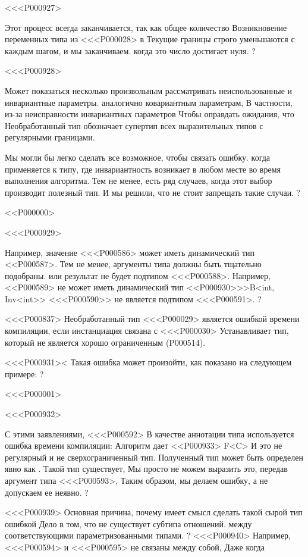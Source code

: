 <<<P000927>{%
Этот процесс всегда заканчивается, так как общее количество
Возникновение переменных типа из <<<P000028> в
Текущие границы строго уменьшаются с каждым шагом, и мы заканчиваем.
когда это число достигает нуля.%
?

<<<P000928>{%
Может показаться несколько произвольным рассматривать неиспользованные и инвариантные параметры.
аналогично ковариантным параметрам,
В частности, из-за неисправности инвариантных параметров
Чтобы оправдать ожидания, что
Необработанный тип обозначает супертип всех выразительных типов с регулярными границами.

Мы могли бы легко сделать все возможное, чтобы связать ошибку.
когда применяется к типу, где инвариантность возникает в любом месте
во время выполнения алгоритма.
Тем не менее, есть ряд случаев, когда этот выбор производит полезный тип.
И мы решили, что не стоит запрещать такие случаи.%
?

<<P000000>

<<<P000929>{%
Например, значение <<<P000586> может иметь динамический тип
<<P000587>.
Тем не менее, аргументы типа должны быть тщательно подобраны.
или результат не будет подтипом <<<P000588>.
Например, <<P000589> не может иметь динамический тип
<<P000930>>>{B<int, Inv<int>{}>}
<<<P000590>> не является подтипом <<<P000591>.%
?

<<<P000837>%
Необработанный тип <<<P000029> является ошибкой времени компиляции, если инстанциация связана с <<<P000030>
Устанавливает тип, который не является хорошо ограниченным
(P000514).

<<<P000931><%
Такая ошибка может произойти, как показано на следующем примере:
?

<<<P000001>

<<<P000932>{%
С этими заявлениями,
<<<P000592> В качестве аннотации типа используется ошибка времени компиляции:
Алгоритм дает <<P000933> F<C\DYNAMIC{}>
И это не регулярный и не сверхограниченный тип.
%
Полученный тип может быть определен явно как
.
Такой тип существует,
Мы просто не можем выразить это, передав аргумент типа <<<P000593>,
Таким образом, мы делаем ошибку, а не допускаем ее неявно.
?

<<<P000939>{%
Основная причина, почему имеет смысл сделать такой сырой тип ошибкой
Дело в том, что не существует субтипа отношений.
между соответствующими параметризованными типами.%
?
<<<P000940>{%
Например, <<<P000594> и <<<P000595> не связаны между собой,
Даже когда }}}}}}
